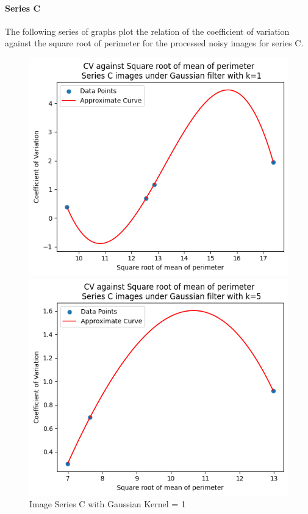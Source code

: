 \documentclass[runningheads]{llncs}
\begin{document}
\paragraph*{\textbf{Series C}}
The following series of graphs plot the relation of the coefficient of variation against the square root of perimeter for the processed noisy images for series C. 
\begin{figure}[h!]
\begin{minipage}[h]{0.47\linewidth}
\begin{center}
\includegraphics[width=1\linewidth]{Report/Result_Images/series_C_Gaussian_kernel_1_perimeter.png} 
\caption{Image Series C with Gaussian Kernel = 1}
\label{SeriesC-Gaussian-Kernel1-PerimeterGraph}
\end{center} 
\end{minipage}
\hfill
\vspace{0.2 cm}
\begin{minipage}[h]{0.47\linewidth}
\begin{center}
\includegraphics[width=1\linewidth]{Report/Result_Images/series_C_Gaussian_kernel_5_perimeter.png} 

\end{center}
\end{minipage}
\end{figure}
\end{document}

